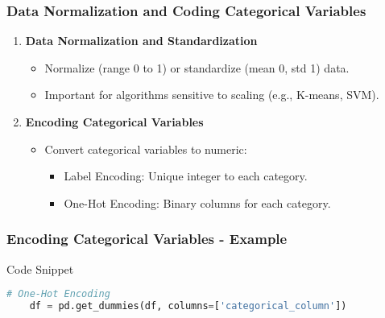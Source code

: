 \documentclass[aspectratio=169]{beamer}
\begin{document}
\begin{frame}[fragile]
    \frametitle{Data Normalization and Coding Categorical Variables}
    \begin{enumerate}
        \item \textbf{Data Normalization and Standardization}
        \begin{itemize}
            \item Normalize (range 0 to 1) or standardize (mean 0, std 1) data.
            \item Important for algorithms sensitive to scaling (e.g., K-means, SVM).
        \end{itemize}

        \item \textbf{Encoding Categorical Variables}
        \begin{itemize}
            \item Convert categorical variables to numeric:
            \begin{itemize}
                \item Label Encoding: Unique integer to each category.
                \item One-Hot Encoding: Binary columns for each category.
            \end{itemize}
        \end{itemize}
    \end{enumerate}
\end{frame}

\begin{frame}[fragile]
    \frametitle{Encoding Categorical Variables - Example}
    \begin{block}{Code Snippet}
    \begin{lstlisting}[language=Python]
    # One-Hot Encoding
    df = pd.get_dummies(df, columns=['categorical_column'])
    \end{lstlisting}
    \end{block}
\end{frame}
\end{document}
